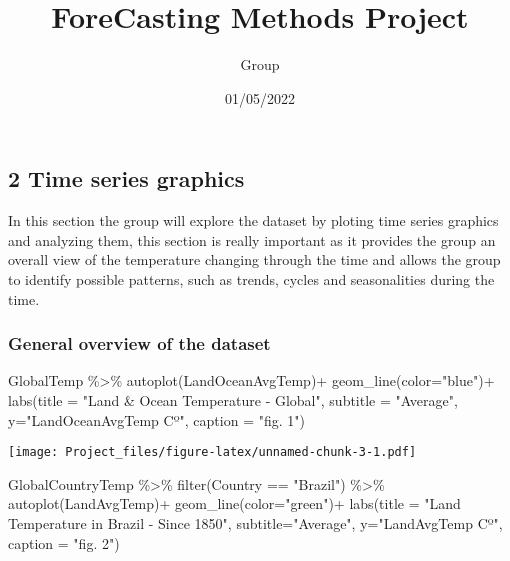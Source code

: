 \documentclass[
]{article}
\title{ForeCasting Methods Project}
\author{Group}
\date{01/05/2022}
\newenvironment{Shaded}{\begin{snugshade}}{\end{snugshade}}
\newcommand{\AttributeTok}[1]{\textcolor[rgb]{0.77,0.63,0.00}{#1}}
\newcommand{\FunctionTok}[1]{\textcolor[rgb]{0.00,0.00,0.00}{#1}}
\newcommand{\NormalTok}[1]{#1}
\newcommand{\SpecialCharTok}[1]{\textcolor[rgb]{0.00,0.00,0.00}{#1}}
\newcommand{\StringTok}[1]{\textcolor[rgb]{0.31,0.60,0.02}{#1}}
\begin{document}
\maketitle

\hypertarget{time-series-graphics}{%
\subsection{2 Time series graphics}\label{time-series-graphics}}

In this section the group will explore the dataset by ploting time
series graphics and analyzing them, this section is really important as
it provides the group an overall view of the temperature changing
through the time and allows the group to identify possible patterns,
such as trends, cycles and seasonalities during the time.

\hypertarget{general-overview-of-the-dataset}{%
\subsubsection{General overview of the
dataset}\label{general-overview-of-the-dataset}}

\begin{Shaded}
\begin{Highlighting}[]
\NormalTok{GlobalTemp }\SpecialCharTok{\%\textgreater{}\%} \FunctionTok{autoplot}\NormalTok{(LandOceanAvgTemp)}\SpecialCharTok{+}
  \FunctionTok{geom\_line}\NormalTok{(}\AttributeTok{color=}\StringTok{"blue"}\NormalTok{)}\SpecialCharTok{+}
  \FunctionTok{labs}\NormalTok{(}\AttributeTok{title =} \StringTok{"Land \& Ocean Temperature {-} Global"}\NormalTok{,}
       \AttributeTok{subtitle =} \StringTok{"Average"}\NormalTok{,}
       \AttributeTok{y=}\StringTok{"LandOceanAvgTemp Cº"}\NormalTok{,}
       \AttributeTok{caption =} \StringTok{"fig. 1"}\NormalTok{)}
\end{Highlighting}
\end{Shaded}

\texttt{[image: Project\_files/figure-latex/unnamed-chunk-3-1.pdf]}

\begin{Shaded}
\begin{Highlighting}[]
\NormalTok{GlobalCountryTemp }\SpecialCharTok{\%\textgreater{}\%} \FunctionTok{filter}\NormalTok{(Country }\SpecialCharTok{==} \StringTok{"Brazil"}\NormalTok{) }\SpecialCharTok{\%\textgreater{}\%} \FunctionTok{autoplot}\NormalTok{(LandAvgTemp)}\SpecialCharTok{+}
  \FunctionTok{geom\_line}\NormalTok{(}\AttributeTok{color=}\StringTok{"green"}\NormalTok{)}\SpecialCharTok{+}
  \FunctionTok{labs}\NormalTok{(}\AttributeTok{title =} \StringTok{"Land Temperature in Brazil {-} Since 1850"}\NormalTok{,}
       \AttributeTok{subtitle=}\StringTok{"Average"}\NormalTok{,}
       \AttributeTok{y=}\StringTok{"LandAvgTemp Cº"}\NormalTok{,}
       \AttributeTok{caption =} \StringTok{"fig. 2"}\NormalTok{)}
\end{Highlighting}
\end{Shaded}
\end{document}
